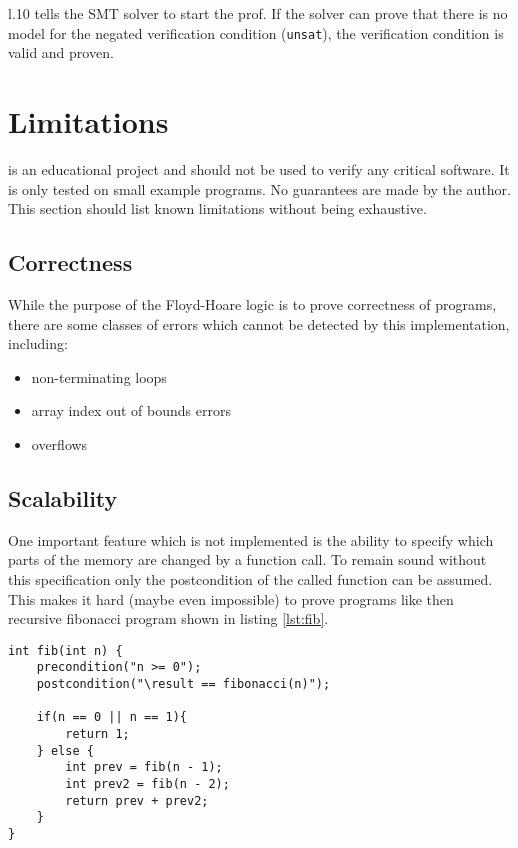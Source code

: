 \documentclass[12pt]{article}
\begin{document}
l.10 tells the SMT solver to start the prof. 
If the solver can prove that there is no model for the negated verification condition (\texttt{unsat}), the verification condition is valid and proven.

\section{Limitations}

\verifyc is an educational project and should not be used to verify any critical software.
It is only tested on small example programs.
No guarantees are made by the author.
This section should list known limitations without being exhaustive.

\subsection{Correctness}
\label{correctness}
While the purpose of the Floyd-Hoare logic is to prove correctness of programs,
there are some classes of errors which cannot be detected by this implementation, including:
\begin{itemize}
    \item non-terminating loops
    \item array index out of bounds errors
    \item overflows
\end{itemize}

\subsection{Scalability}
\label{completeness}
One important feature which is not implemented is the ability to specify which parts of the memory are
changed by a function call.
To remain sound without this specification only the postcondition of the called function can be assumed.
This makes it hard (maybe even impossible) to prove programs like then recursive fibonacci program shown in listing \ref{lst:fib}.

\begin{minipage}{\linewidth}
\begin{lstlisting}[style=c0, caption=a recursive fibonacci program, label=lst:fib]
int fib(int n) {
    precondition("n >= 0");
    postcondition("\result == fibonacci(n)");

    if(n == 0 || n == 1){
        return 1;
    } else {
        int prev = fib(n - 1);
        int prev2 = fib(n - 2);
        return prev + prev2;
    }
}
\end{lstlisting}
\end{minipage}
\end{document}
